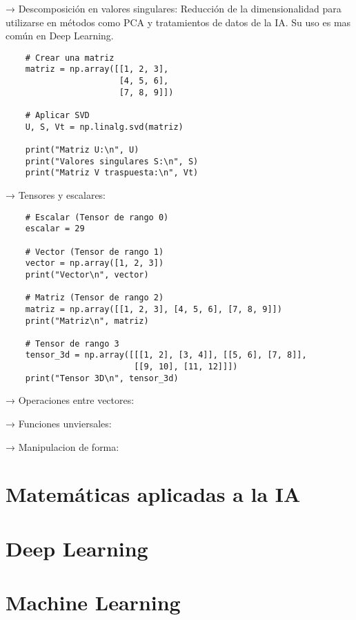 \documentclass{templateNote}
\begin{document}
\noindent → Descomposición en valores singulares: Reducción de la dimensionalidad para utilizarse en métodos como PCA y tratamientos de datos de la IA. Su uso es mas común en Deep Learning.
\begin{lstlisting}
    # Crear una matriz
    matriz = np.array([[1, 2, 3],
                       [4, 5, 6],
                       [7, 8, 9]])

    # Aplicar SVD
    U, S, Vt = np.linalg.svd(matriz)

    print("Matriz U:\n", U)
    print("Valores singulares S:\n", S)
    print("Matriz V traspuesta:\n", Vt)
\end{lstlisting}

\noindent → Tensores y escalares: 
\begin{lstlisting}
    # Escalar (Tensor de rango 0)
    escalar = 29

    # Vector (Tensor de rango 1)
    vector = np.array([1, 2, 3])
    print("Vector\n", vector)

    # Matriz (Tensor de rango 2)
    matriz = np.array([[1, 2, 3], [4, 5, 6], [7, 8, 9]])
    print("Matriz\n", matriz)

    # Tensor de rango 3
    tensor_3d = np.array([[[1, 2], [3, 4]], [[5, 6], [7, 8]], 
                          [[9, 10], [11, 12]]])
    print("Tensor 3D\n", tensor_3d)
\end{lstlisting}

\noindent → Operaciones entre vectores: 

\noindent → Funciones unviersales:

\noindent → Manipulacion de forma:




\newpage
\section{Matemáticas aplicadas a la IA}

\newpage
\section{Deep Learning}

\newpage
\section{Machine Learning}
\end{document}
